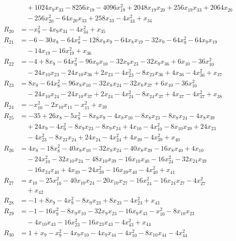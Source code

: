 \begin{align*}
&\quad +1024x_{9}x_{33}-8256x_{19}-4096x_{19}^{2}+2048x_{19}x_{20}+256x_{19}x_{33}+2064x_{20}\\
&\quad -256x_{20}^{2}-64x_{20}x_{33}+258x_{33}-4x_{33}^{2}+x_{34}\\[2pt]
R_{20}&=-x_{9}^{2}-4x_{9}x_{34}-4x_{34}^{2}+x_{35}\\[2pt]
R_{21}&=-6-30x_{8}-64x_{8}^{2}-128x_{8}x_{9}-64x_{8}x_{19}-32x_{9}-64x_{9}^{2}-64x_{9}x_{19}\\
&\quad -14x_{19}-16x_{19}^{2}+x_{36}\\[2pt]
R_{22}&=-4+8x_{9}-64x_{9}^{2}-96x_{9}x_{10}-32x_{9}x_{23}-32x_{9}x_{36}+6x_{10}-36x_{10}^{2}\\
&\quad -24x_{10}x_{23}-24x_{10}x_{36}+2x_{23}-4x_{23}^{2}-8x_{23}x_{36}+4x_{36}-4x_{36}^{2}+x_{37}\\[2pt]
R_{23}&=8x_{8}-64x_{8}^{2}-96x_{8}x_{10}-32x_{8}x_{24}-32x_{8}x_{37}+6x_{10}-36x_{10}^{2}\\
&\quad -24x_{10}x_{24}-24x_{10}x_{37}+2x_{24}-4x_{24}^{2}-8x_{24}x_{37}+4x_{37}-4x_{37}^{2}+x_{38}\\[2pt]
R_{24}&=-x_{10}^{2}-2x_{10}x_{11}-x_{11}^{2}+x_{39}\\[2pt]
R_{25}&=-35+26x_{8}-5x_{8}^{2}-8x_{8}x_{9}-4x_{8}x_{10}-8x_{8}x_{23}-8x_{8}x_{24}-4x_{8}x_{39}\\
&\quad +24x_{9}-4x_{9}^{2}-8x_{9}x_{23}-8x_{9}x_{24}+4x_{10}-4x_{10}^{2}-8x_{10}x_{39}+24x_{23}\\
&\quad -4x_{23}^{2}-8x_{23}x_{24}+24x_{24}-4x_{24}^{2}+4x_{39}-4x_{39}^{2}+x_{40}\\[2pt]
R_{26}&=4x_{8}-18x_{8}^{2}-40x_{8}x_{10}-32x_{8}x_{24}-40x_{8}x_{39}-16x_{8}x_{40}+4x_{10}\\
&\quad -24x_{10}^{2}-32x_{10}x_{24}-48x_{10}x_{39}-16x_{10}x_{40}-16x_{24}^{2}-32x_{24}x_{39}\\
&\quad -16x_{24}x_{40}+4x_{39}-24x_{39}^{2}-16x_{39}x_{40}-4x_{40}^{2}+x_{41}\\[2pt]
R_{27}&=x_{10}-25x_{10}^{2}-40x_{10}x_{24}-20x_{10}x_{27}-16x_{24}^{2}-16x_{24}x_{27}-4x_{27}^{2}\\
&\quad +x_{42}\\[2pt]
R_{28}&=-1+8x_{9}-4x_{9}^{2}-8x_{9}x_{23}+8x_{23}-4x_{23}^{2}+x_{43}\\[2pt]
R_{29}&=-1-16x_{9}^{2}-8x_{9}x_{10}-32x_{9}x_{23}-16x_{9}x_{43}-x_{10}^{2}-8x_{10}x_{23}\\
&\quad -4x_{10}x_{43}-16x_{23}^{2}-16x_{23}x_{43}-4x_{43}^{2}+x_{44}\\[2pt]
R_{30}&=1+x_{9}-x_{9}^{2}-4x_{9}x_{10}-4x_{9}x_{44}-4x_{10}^{2}-8x_{10}x_{44}-4x_{44}^{2}\\

\end{align*}
